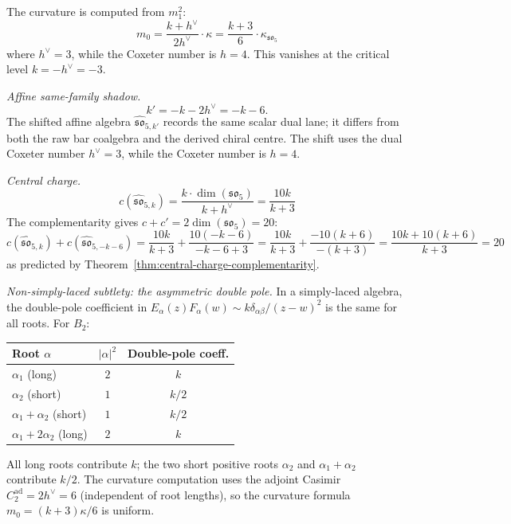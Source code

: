 \begin{computation}
\label{comp:so5-curvature}

The curvature is computed from $m_1^2$:
\begin{equation}
m_0 = \frac{k + h^\vee}{2h^\vee} \cdot \kappa
= \frac{k + 3}{6} \cdot \kappa_{\mathfrak{so}_5}
\end{equation}
where $h^\vee = 3$, while the Coxeter number is $h = 4$. This
vanishes at the critical level
$k = -h^\vee = -3$.

\emph{Affine same-family shadow.}
\begin{equation}\label{eq:so5-level-shift}
k'=-k-2h^\vee=-k-6.
\end{equation}
The shifted affine algebra $\widehat{\mathfrak{so}}_{5,k'}$ records
the same scalar dual lane; it differs from both the raw bar coalgebra
and the derived chiral centre. The shift uses the dual Coxeter number
$h^\vee = 3$, while the Coxeter number is $h = 4$.

\emph{Central charge.}
\begin{equation}
c(\widehat{\mathfrak{so}}_{5,k}) = \frac{k \cdot \dim(\mathfrak{so}_5)}{k + h^\vee}
= \frac{10k}{k + 3}
\end{equation}
The complementarity gives $c + c' = 2\dim(\mathfrak{so}_5) = 20$:
\begin{equation}
c(\widehat{\mathfrak{so}}_{5,k}) + c(\widehat{\mathfrak{so}}_{5,-k-6})
= \frac{10k}{k+3} + \frac{10(-k-6)}{-k-6+3}
= \frac{10k}{k+3} + \frac{-10(k+6)}{-(k+3)}
= \frac{10k + 10(k+6)}{k+3} = 20
\end{equation}
as predicted by Theorem~\ref{thm:central-charge-complementarity}.

\emph{Non-simply-laced subtlety: the asymmetric double pole.}
In a simply-laced algebra, the double-pole coefficient in
$E_\alpha(z) F_\alpha(w) \sim k\delta_{\alpha\beta}/(z-w)^2$
is the same for all roots. For $B_2$:
\begin{center}
\renewcommand{\arraystretch}{1.2}
\begin{tabular}{lcc}
\textbf{Root $\alpha$} & \textbf{$|\alpha|^2$} & \textbf{Double-pole coeff.} \\
\hline
$\alpha_1$ (long) & $2$ & $k$ \\
$\alpha_2$ (short) & $1$ & $k/2$ \\
$\alpha_1+\alpha_2$ (short) & $1$ & $k/2$ \\
$\alpha_1+2\alpha_2$ (long) & $2$ & $k$
\end{tabular}
\end{center}
All long roots contribute $k$; the two short positive roots
$\alpha_2$ and $\alpha_1+\alpha_2$ contribute $k/2$. The curvature computation uses the adjoint
Casimir $C_2^{\mathrm{ad}} = 2h^\vee = 6$ (independent of root lengths),
so the curvature formula $m_0 = (k+3)\kappa/6$ is uniform.
\end{computation}

